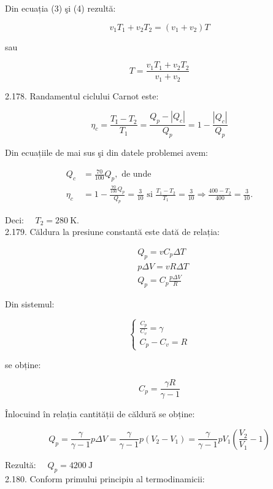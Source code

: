 Din ecuația (3) şi (4) rezultă:


\begin{equation*}
v_{1} T_{1}+v_{2} T_{2}=\left(v_{1}+v_{2}\right) T \tag{5}
\end{equation*}


sau

$$
T=\frac{v_{1} T_{1}+v_{2} T_{2}}{v_{1}+v_{2}}
$$

2.178. Randamentul ciclului Carnot este:

$$
\eta_{c}=\frac{T_{\mathrm{I}}-T_{2}}{T_{1}}=\frac{Q_{p}-\left|Q_{c}\right|}{Q_{p}}=1-\frac{\left|Q_{c}\right|}{Q_{p}}
$$

Din ecuațiile de mai sus şi din datele problemei avem:

$$
\begin{aligned}
Q_{c} & =\frac{70}{100} Q_{p}, \text { de unde } \\
\eta_{c} & =1-\frac{\frac{70}{100} Q_{p}}{Q_{p}}=\frac{3}{10} \text { si } \frac{T_{1}-T_{2}}{T_{1}}=\frac{3}{10} \Rightarrow \frac{400-T_{2}}{400}=\frac{3}{10} .
\end{aligned}
$$

Deci: $\quad T_{2}=280 \mathrm{~K}$.\\
2.179. Căldura la presiune constantă este dată de relația:

$$
\begin{aligned}
& Q_{p}=v C_{p} \Delta T \\
& p \Delta V=v R \Delta T \\
& Q_{p}=C_{p} \frac{p \Delta V}{R}
\end{aligned}
$$

Din sistemul:

$$
\left\{\begin{array}{l}
\frac{C_{p}}{C_{v}}=\gamma \\
C_{p}-C_{v}=R
\end{array}\right.
$$

se obține:

$$
C_{p}=\frac{\gamma R}{\gamma-1}
$$

Înlocuind în relația cantității de căldură se obține:

$$
Q_{p}=\frac{\gamma}{\gamma-1} p \Delta V=\frac{\gamma}{\gamma-1} p\left(V_{2}-V_{1}\right)=\frac{\gamma}{\gamma-1} p V_{1}\left(\frac{V_{2}}{V_{1}}-1\right)
$$

Rezultă: $\quad Q_{p}=4200 \mathrm{~J}$\\
2.180. Conform primului principiu al termodinamicii:

